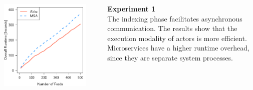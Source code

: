 \documentclass[final,hyperref={pdfpagelabels=true}]{beamer}
\begin{document}
\begin{frame}
\begin{columns}[t]
\begin{column}{.43\textwidth}
      \begin{columns}[t]
        \begin{column}{.46\textwidth}
          \begin{center}
          \includegraphics[width=1\textwidth]{graphics/eval-index-overall.pdf}
          \end{center}
        \end{column}
        \begin{column}{.08\textwidth}
        \end{column}
        \begin{column}{.46\textwidth}
          {\lmodern
            \begin{justify}
              \textsf{\textbf{Experiment 1}} \\
              \vspace*{.5\baselineskip}
              The indexing phase facilitates asynchronous communication. The results show that the execution modality of actors is more efficient. Microservices have a higher runtime overhead, since they are separate system processes. 
            \end{justify}
          }
        \end{column}
      \end{columns}


\end{column}
\end{columns}
\end{frame}
\end{document}
